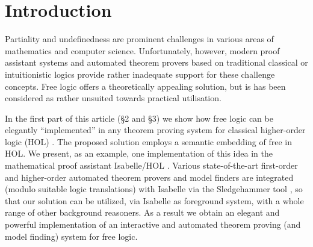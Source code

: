 \section{Introduction}
\label{intro}
Partiality and undefinedness are prominent challenges in various areas
of mathematics and computer science.  Unfortunately, however, modern
proof assistant systems and automated theorem provers based on
traditional classical or intuitionistic logics provide rather
inadequate support for these challenge concepts.  Free logic \cite{Lambert60,Scott67,lambert02:_free_logic,sep-logic-free} offers a
theoretically appealing solution, but is has been considered as rather
unsuited towards practical utilisation.


In the first part of this article (\S2 and \S3) we show how free logic
can be elegantly ``implemented'' in any theorem proving system for
classical higher-order logic (HOL) \cite{B5}. The proposed solution
employs a semantic embedding of free in HOL. We present, as an
example, one implementation of this idea in the mathematical proof
assistant Isabelle/HOL \cite{NPW02}. Various state-of-the-art
first-order and higher-order automated theorem provers and model
finders are integrated (modulo suitable logic translations) with
Isabelle via the Sledgehammer tool \cite{Sledgehammer}, so that our
solution can be utilized, via Isabelle as foreground system, with a
whole range of other background reasoners. As a result we obtain an
elegant and powerful implementation of an interactive and automated
theorem proving (and model finding) system for free logic.





 
